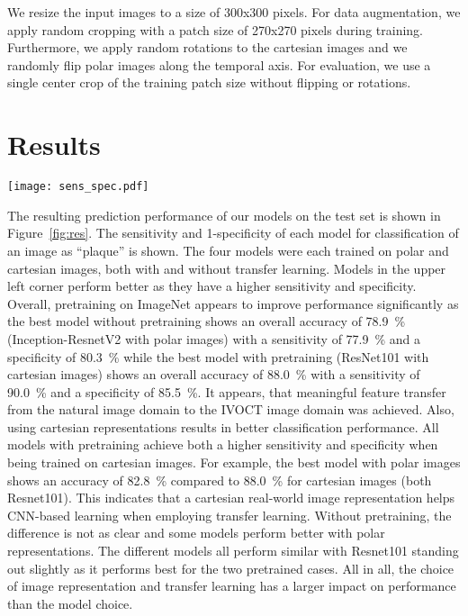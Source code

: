 We resize the input images to a size of 300x300 pixels. For data augmentation, we apply random cropping with a patch size of 270x270 pixels during training. Furthermore, we apply random rotations to the cartesian images and we randomly flip polar images along the temporal axis. For evaluation, we use a single center crop of the training patch size without flipping or rotations.

\section{Results}

\begin{figure*}
  \centering
  \texttt{[image: sens\_spec.pdf]}
\caption{The sensitivity and 1-specificity of 16 different models for binary plaque classification is shown. Each mark represents one network architecture. ‘*’ refers to ResNet50, ‘x’ refers to ResNet101, ‘o’ refers to InceptionV3 and ‘+’ refers to Inception-ResnetV2.}
\label{fig:res}       %
\end{figure*}

The resulting prediction performance of our models on the test set is shown in Figure~\ref{fig:res}. The sensitivity and 1-specificity of each model for classification of an image as “plaque” is shown. The four models were each trained on polar and cartesian images, both with and without transfer learning. Models in the upper left corner perform better as they have a higher sensitivity and specificity. 
Overall, pretraining on ImageNet appears to improve performance significantly as the best model without pretraining shows an overall accuracy of \SI{78.9}{\percent} (Inception-ResnetV2 with polar images) with a sensitivity of \SI{77.9}{\percent} and a specificity of \SI{80.3}{\percent} while the best model with pretraining (ResNet101 with cartesian images) shows an overall accuracy of  \SI{88.0}{\percent} with a sensitivity of \SI{90.0}{\percent} and a specificity of \SI{85.5}{\percent}. It appears, that meaningful feature transfer from the natural image domain to the IVOCT image domain was achieved. 
Also, using cartesian representations results in better classification performance. All models with pretraining achieve both a higher sensitivity and specificity when being trained on cartesian images. For example, the best model with polar images shows an accuracy of \SI{82.8}{\percent} compared to \SI{88.0}{\percent} for cartesian images (both Resnet101). This indicates that a cartesian real-world image representation helps CNN-based learning when employing transfer learning. Without pretraining, the difference is not as clear and some models perform better with polar representations.
The different models all perform similar with Resnet101 standing out slightly as it performs best for the two pretrained cases. All in all, the choice of image representation and transfer learning has a larger impact on performance than the model choice.

